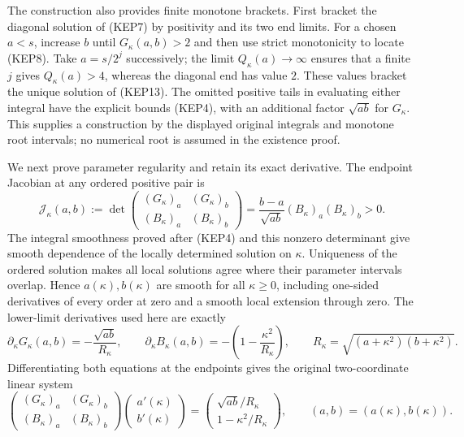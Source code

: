 The construction also provides finite monotone brackets. First bracket
the diagonal solution of (KEP7) by positivity and its two end limits.
For a chosen $a<s$, increase $b$ until $G_\kappa(a,b)>2$ and then use
strict monotonicity to locate (KEP8). Take $a=s/2^j$ successively;
the limit $Q_\kappa(a)\to\infty$ ensures that a finite $j$ gives
$Q_\kappa(a)>4$, whereas the diagonal end has value $2$.
These values bracket the unique solution of (KEP13).
The omitted positive tails in evaluating either integral have the
explicit bounds (KEP4), with an additional factor $\sqrt{ab}$ for
$G_\kappa$. This supplies a construction by the displayed original
integrals and monotone root intervals; no numerical root is assumed
in the existence proof.

We next prove parameter regularity and retain its exact derivative.
The endpoint Jacobian at any ordered positive pair is
\begin{equation}\tag{KEP14}
 \mathcal J_\kappa(a,b):=
 \det\begin{pmatrix}(G_\kappa)_a&(G_\kappa)_b\\
                    (B_\kappa)_a&(B_\kappa)_b\end{pmatrix}
 =\frac{b-a}{\sqrt{ab}}(B_\kappa)_a(B_\kappa)_b>0.
\end{equation}
The integral smoothness proved after (KEP4) and this nonzero determinant
give smooth dependence of the locally determined solution on $\kappa$.
Uniqueness of the ordered solution makes all local solutions agree
where their parameter intervals overlap. Hence $a(\kappa),b(\kappa)$ are smooth
for all $\kappa\geq0$, including one-sided derivatives of every order at
zero and a smooth local extension through zero. The lower-limit
derivatives used here are exactly
\begin{equation}\tag{KEP15}
 \partial_\kappa G_\kappa(a,b)=-\frac{\sqrt{ab}}{R_\kappa},\qquad
 \partial_\kappa B_\kappa(a,b)=-\left(1-\frac{\kappa^2}{R_\kappa}\right),
 \qquad R_\kappa=\sqrt{(a+\kappa^2)(b+\kappa^2)}.
\end{equation}
Differentiating both equations at the endpoints gives the original
two-coordinate linear system
\begin{equation}\tag{KEP16}
 \begin{pmatrix}(G_\kappa)_a&(G_\kappa)_b\\
                (B_\kappa)_a&(B_\kappa)_b\end{pmatrix}
 \begin{pmatrix}a'(\kappa)\\b'(\kappa)\end{pmatrix}
 =\begin{pmatrix}\sqrt{ab}/R_\kappa\\1-\kappa^2/R_\kappa\end{pmatrix},
 \qquad (a,b)=(a(\kappa),b(\kappa)).
\end{equation}
